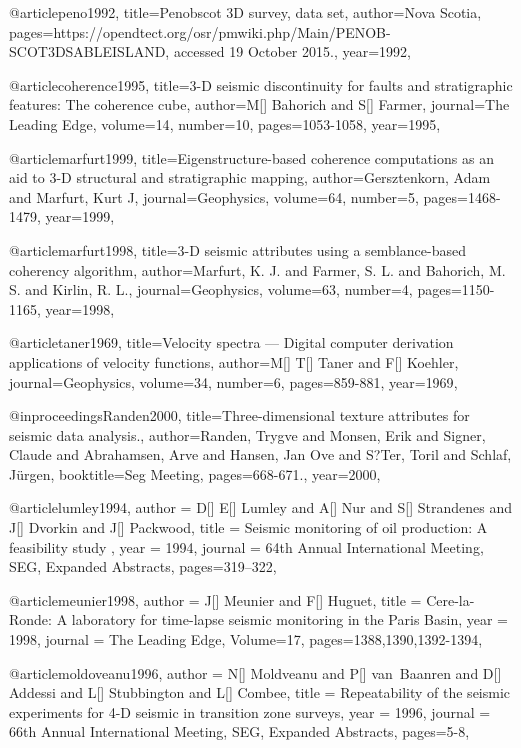 @article{peno1992,
  title={Penobscot 3D survey, data set},
  author={Nova Scotia},
  pages={https://opendtect.org/osr/pmwiki.php/Main/PENOB- SCOT3DSABLEISLAND, accessed 19 October 2015.},
  year={1992},
}

@article{coherence1995,
  title={3-D seismic discontinuity for faults and stratigraphic features: The coherence cube},
  author={M[] Bahorich and S[] Farmer},
  journal={The Leading Edge},
  volume={14},
  number={10},
  pages={1053-1058},
  year={1995},
}

@article{marfurt1999,
  title={Eigenstructure-based coherence computations as an aid to 3-D structural and stratigraphic mapping},
  author={Gersztenkorn, Adam and Marfurt, Kurt J},
  journal={Geophysics},
  volume={64},
  number={5},
  pages={1468-1479},
  year={1999},
}

@article{marfurt1998,
  title={3-D seismic attributes using a semblance-based coherency algorithm},
  author={Marfurt, K. J. and Farmer, S. L. and Bahorich, M. S. and Kirlin, R. L.},
  journal={Geophysics},
  volume={63},
  number={4},
  pages={1150-1165},
  year={1998},
}

@article{taner1969,
  title={Velocity spectra — Digital computer derivation applications of velocity functions},
  author={M[] T[] Taner and F[] Koehler},
  journal={Geophysics},
  volume={34},
  number={6},
  pages={859-881},
  year={1969},
}

@inproceedings{Randen2000,
  title={Three-dimensional texture attributes for seismic data analysis.},
  author={Randen, Trygve and Monsen, Erik and Signer, Claude and Abrahamsen, Arve and Hansen, Jan Ove and S?Ter, Toril and Schlaf, Jürgen},
  booktitle={Seg Meeting},
  pages={668-671.},
  year={2000},
}








@article{lumley1994,
  author =	 {D[] E[] Lumley and A[] Nur and S[] Strandenes and J[] Dvorkin and J[] Packwood},
  title =	 {Seismic monitoring of oil production: A feasibility study
},
  year =	 1994,
  journal =	 {64th Annual International Meeting, SEG, Expanded Abstracts},
 pages=319–322,
}

@article{meunier1998,
  author =	 {J[] Meunier and F[] Huguet},
  title =	 {Cere-la-Ronde: A laboratory for time-lapse seismic monitoring in the Paris Basin},
  year =	 1998,
  journal =	 {The Leading Edge},
    Volume=17,
 pages=1388,1390,1392-1394,
}

@article{moldoveanu1996,
  author =	 {N[] Moldveanu and P[] van~Baanren and D[] Addessi and L[] Stubbington and L[] Combee},
  title =	 {Repeatability of the seismic experiments for 4-D
seismic in transition zone surveys},
  year =	 1996,
  journal =	 {66th Annual International Meeting, SEG, Expanded Abstracts},
 pages=5-8,
}


